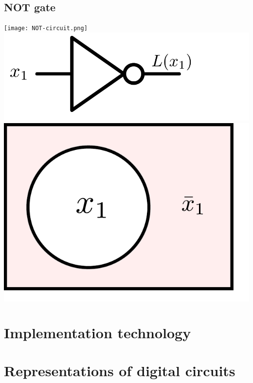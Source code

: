 \documentclass{article}
\begin{document}
\subsection{NOT gate}
\texttt{[image: NOT-circuit.png]}
\includegraphics[width=0.5\linewidth]{NOT_ANSI.pdf}
\includegraphics[width=0.5\linewidth]{NOT_Venn_x1.pdf}

\section{Implementation technology}

\section{Representations of digital circuits}


%
%
\end{document}
